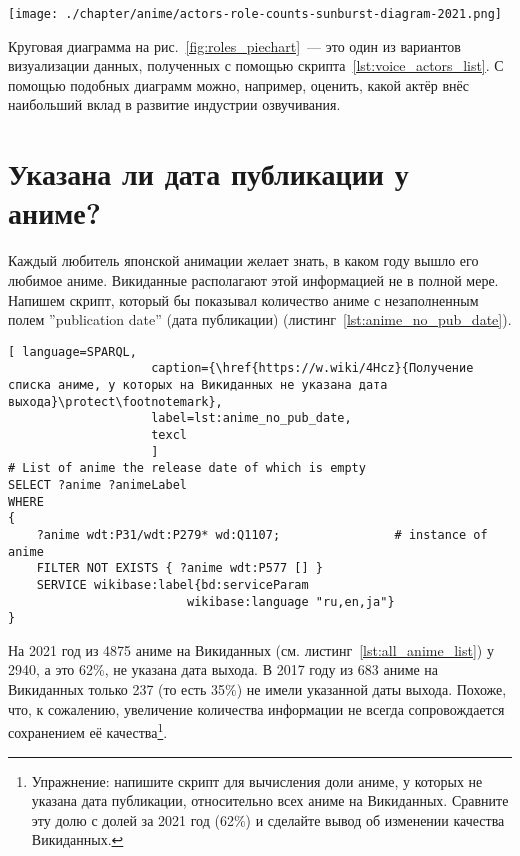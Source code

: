 \begin{figure*}[h]
	\texttt{[image: ./chapter/anime/actors-role-counts-sunburst-diagram-2021.png]}
	\caption[Круговая диаграмма числа ролей, озвученных различными сэйю, 2021.]{Диаграмма <<солнечные лучи>> числа ролей, озвученных различными актёрами, построенная с помощью сервиса Rawgraphs (\href{https://app.rawgraphs.io}{https://app.rawgraphs.io}).}%
      \label{fig:roles_piechart}%
\end{figure*}

Круговая диаграмма на рис.~\protect\ref{fig:roles_piechart}~--- это один из вариантов визуализации данных, полученных с помощью скрипта~\protect\ref{lst:voice_actors_list}. С помощью подобных диаграмм можно, например, оценить, какой актёр внёс наибольший вклад в развитие индустрии озвучивания.

\section{Указана ли дата публикации у аниме?}

Каждый любитель японской анимации желает знать, в каком году вышло его любимое аниме. Викиданные располагают этой информацией не в полной мере. Напишем скрипт, который бы показывал количество аниме с незаполненным полем ''publication date'' (дата публикации) (листинг~\protect\ref{lst:anime_no_pub_date}). 

\begin{lstlisting}[ language=SPARQL, 
                    caption={\href{https://w.wiki/4Hcz}{Получение списка аниме, у которых на Викиданных не указана дата выхода}\protect\footnotemark},
                    label=lst:anime_no_pub_date,
                    texcl 
                    ]
# List of anime the release date of which is empty
SELECT ?anime ?animeLabel
WHERE
{
    ?anime wdt:P31/wdt:P279* wd:Q1107;                # instance of anime
    FILTER NOT EXISTS { ?anime wdt:P577 [] }
    SERVICE wikibase:label{bd:serviceParam
					     wikibase:language "ru,en,ja"}
}
\end{lstlisting}%

На 2021 год из \num{4875} аниме на Викиданных (см. листинг~\protect\ref{lst:all_anime_list}) у \num{2940}, а это \num{62}\%, не указана дата выхода. В 2017 году из \num{683} аниме на Викиданных только \num{237} (то есть \num{35}\%) не имели указанной даты выхода. Похоже, что, к сожалению, увеличение количества информации не всегда сопровождается сохранением её качества\footnote{Упражнение: напишите скрипт для вычисления доли аниме, у которых не указана дата публикации, относительно всех аниме на Викиданных. Сравните эту долю с долей за 2021 год (\num{62}\%) и сделайте вывод об изменении качества Викиданных.}.

